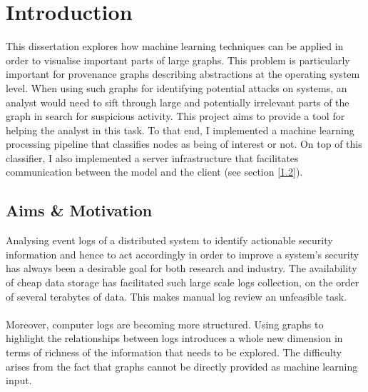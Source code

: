 
	
	\chapter{Introduction}
	
	This dissertation explores how machine learning techniques can be applied in order to visualise important parts of large graphs. This problem is particularly important for provenance graphs describing abstractions at the operating system level. When using such graphs for identifying potential attacks on systems, an analyst would need to sift through large and potentially irrelevant parts of the graph in search for suspicious activity. This project aims to provide a tool for helping the analyst in this task. To that end, I implemented a machine learning processing pipeline that classifies nodes as being of interest or not. On top of this classifier, I also implemented a server infrastructure that facilitates communication between the model and the client (see section \ref{1.2}). 
	
	\section{Aims \& Motivation}  \label{1.1}
	Analysing event logs of a distributed system to identify actionable security information and hence to act accordingly in order to improve a system's security has always been a desirable goal for both research and industry. The availability of cheap data storage has facilitated such large scale logs collection, on the order of several terabytes of data. This makes manual log review an unfeasible task. 
	\\ \\
	Moreover, computer logs are becoming more structured. Using graphs to highlight the relationships between logs introduces a whole new dimension in terms of richness of the information that needs to be explored. The difficulty arises from the fact that graphs cannot be directly provided as machine learning input.
	
